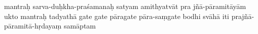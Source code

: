 \newpage
mantraḥ sarva-duḥkha-praśamanaḥ satyam amithyatvāt pra\-%
jñā-pāramitāyām ukto mantraḥ \da{} tadyathā gate gate pāragate
pāra-saṃgate bodhi svāhā \dd{} iti prajñā-pāramitā-hṛdayaṃ
samāptam \dd{}


\newpage
\theendnotes


